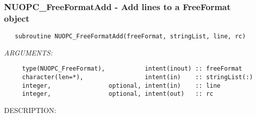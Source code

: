  
\setlength{\oldparskip}{\parskip}
\setlength{\parskip}{1.5ex}
\setlength{\oldparindent}{\parindent}
\setlength{\parindent}{0pt}
\setlength{\oldbaselineskip}{\baselineskip}
\setlength{\baselineskip}{11pt}
 
\def\bv{\begin{verbatim}}
\def\ev{\end{verbatim}}
\def\be{\begin{equation}}
\def\ee{\end{equation}}
\def\bea{\begin{eqnarray}}
\def\eea{\end{eqnarray}}
\def\bi{\begin{itemize}}
\def\ei{\end{itemize}}
\def\bn{\begin{enumerate}}
\def\en{\end{enumerate}}
\def\bd{\begin{description}}
\def\ed{\end{description}}
\def\({\left (}
\def\){\right )}
\def\[{\left [}
\def\]{\right ]}
\def\<{\left  \langle}
\def\>{\right \rangle}
\def\cI{{\cal I}}
\def\diag{\mathop{\rm diag}}
\def\tr{\mathop{\rm tr}}


 
\subsubsection [NUOPC\_FreeFormatAdd] {NUOPC\_FreeFormatAdd - Add lines to a FreeFormat object}


\begin{verbatim}   subroutine NUOPC_FreeFormatAdd(freeFormat, stringList, line, rc)\end{verbatim}{\em ARGUMENTS:}
\begin{verbatim}     type(NUOPC_FreeFormat),           intent(inout) :: freeFormat
     character(len=*),                 intent(in)    :: stringList(:)
     integer,                optional, intent(in)    :: line
     integer,                optional, intent(out)   :: rc\end{verbatim}
{\sf DESCRIPTION:\\ }


